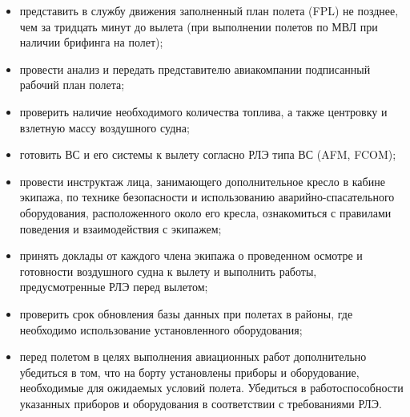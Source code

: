 \begin{itemize}
    \item представить в службу движения заполненный план полета (FPL) не позднее, чем за тридцать минут до вылета (при выполнении полетов по МВЛ при наличии брифинга на полет);
    \item провести анализ и передать представителю авиакомпании подписанный рабочий план полета;
    \item проверить наличие необходимого количества топлива, а также центровку и взлетную массу воздушного судна;
    \item готовить ВС и его системы к вылету согласно РЛЭ типа ВС (AFM, FCOM);
    \item провести инструктаж лица, занимающего дополнительное кресло в кабине экипажа, по технике безопасности и использованию аварийно-спасательного оборудования, расположенного около его кресла, ознакомиться с правилами поведения и взаимодействия с экипажем;
    \item принять доклады от каждого члена экипажа о проведенном осмотре и готовности воздушного судна к вылету и выполнить работы, предусмотренные РЛЭ перед вылетом;
    \item проверить срок обновления базы данных при полетах в районы, где необходимо использование  
установленного оборудования; 
\item перед полетом в целях выполнения авиационных работ дополнительно убедиться в том, что на борту установлены приборы и оборудование, необходимые для ожидаемых условий полета. Убедиться в работоспособности указанных приборов и оборудования в соответствии с требованиями РЛЭ.
\end{itemize}

